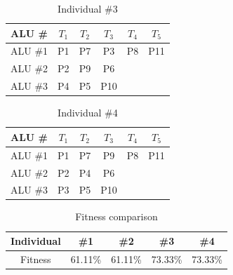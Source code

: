 \documentclass[conference]{IEEEtran}
\begin{document}
\begin{table}[h!]
    \centering
    \begin{tabular}{|c|c|c|c|c|c|}
        \hline
    ALU \#  & $T_1$ & $T_2$ &  $T_3$& $T_4$ & $T_5$ \\
    \hline
       ALU \#1  & P1 & P7 &  P3& P8 & P11\\
       \hline
       ALU \#2  &  P2 & P9 & P6 &  &\\
       \hline
       ALU \#3  & P4 & P5  & P10 &  & \\
       \hline
    \end{tabular}
           \vspace{2pt}
    \caption{Individual \#3}
    \label{tab:Individual3}
\end{table}
\begin{table}[h!]
    \centering
    \begin{tabular}{|c|c|c|c|c|c|}
    \hline
    ALU \#  & $T_1$ & $T_2$ &  $T_3$& $T_4$ & $T_5$ \\
        \hline
       ALU \#1  & P1 & P7 &  P9& P8 & P11\\
       \hline
       ALU \#2  &  P2 & P4 & P6 &  &\\
       \hline
       ALU \#3  & P3 & P5  & P10 &  & \\
       \hline
    \end{tabular}
           \vspace{2pt}
    \caption{Individual \#4}
    \label{tab:Individual4}
\end{table}

\begin{table}[h!]
    \centering
    \begin{tabular}{|c|c|c|c|c|}
    \hline
        Individual & \#1 & \#2 & \#3 & \#4\\
        \hline
        Fitness & 61.11\% & 61.11\% & 73.33\% & 73.33\%\\
        \hline
    \end{tabular}
    \vspace{2pt}
    \caption{Fitness comparison}
    \label{tab:fitness}
\end{table}
\end{document}
